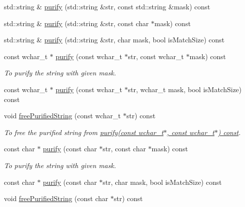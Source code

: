 \begin{DoxyCompactItemize}
\item 
std\+::string \& \hyperlink{classlakoo_1_1_text_purifier_a7f42b3e77f1f0e76e641aabfb53a8fb0}{purify} (std\+::string \&str, const std\+::string \&mask) const
\item 
std\+::string \& \hyperlink{classlakoo_1_1_text_purifier_a3c141f3ac2e12b70b37436cbefa9c347}{purify} (std\+::string \&str, const char $\ast$mask) const
\item 
std\+::string \& \hyperlink{classlakoo_1_1_text_purifier_a8666a23427c503c2107ca4c3fe0c9100}{purify} (std\+::string \&str, char mask, bool is\+Match\+Size) const
\item 
const wchar\+\_\+t $\ast$ \hyperlink{classlakoo_1_1_text_purifier_aa17c1206115640f6f7556220639bdddc}{purify} (const wchar\+\_\+t $\ast$str, const wchar\+\_\+t $\ast$mask) const
\begin{DoxyCompactList}\small\item\em To purify the string with given mask. \end{DoxyCompactList}\item 
const wchar\+\_\+t $\ast$ \hyperlink{classlakoo_1_1_text_purifier_a87d4b9e6f1b4075ebfd582fae5ed50d1}{purify} (const wchar\+\_\+t $\ast$str, wchar\+\_\+t mask, bool is\+Match\+Size) const
\item 
void \hyperlink{classlakoo_1_1_text_purifier_ae7538cf80a89eab28e645cd2a917ace3}{free\+Purified\+String} (const wchar\+\_\+t $\ast$str) const
\begin{DoxyCompactList}\small\item\em To free the purified string from \hyperlink{classlakoo_1_1_text_purifier_aa17c1206115640f6f7556220639bdddc}{purify(const wchar\+\_\+t$\ast$, const wchar\+\_\+t$\ast$) const}. \end{DoxyCompactList}\item 
const char $\ast$ \hyperlink{classlakoo_1_1_text_purifier_aacd5ea50d3d7cb6e800e40252fbc617b}{purify} (const char $\ast$str, const char $\ast$mask) const
\begin{DoxyCompactList}\small\item\em To purify the string with given mask. \end{DoxyCompactList}\item 
const char $\ast$ \hyperlink{classlakoo_1_1_text_purifier_a6798b4b235afa57f83fd8cb0b6ed929d}{purify} (const char $\ast$str, char mask, bool is\+Match\+Size) const
\item 
void \hyperlink{classlakoo_1_1_text_purifier_abef9e8819d7b575cf279ce363ec67254}{free\+Purified\+String} (const char $\ast$str) const

\end{DoxyCompactItemize}
